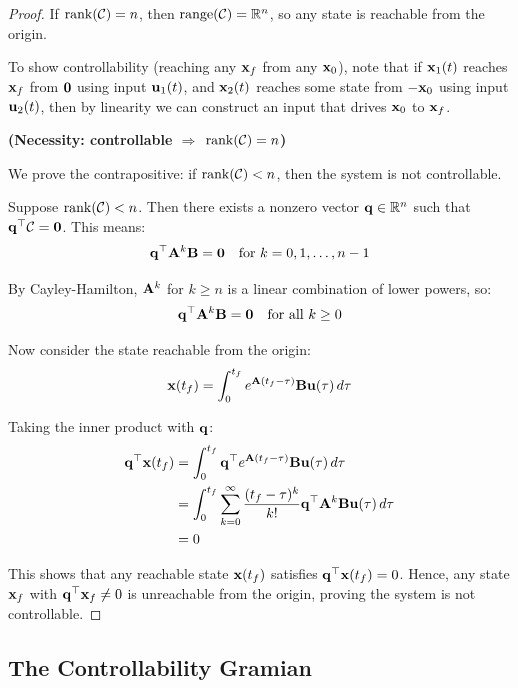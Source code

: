 \begin{proof}
If $\operatorname{rank}(\mathcal{C}) = n$, then $\text{range}(\mathcal{C}) = \mathbb{R}^n$, so any state is reachable from the origin.

To show controllability (reaching any $\mathbf{x}_f$ from any $\mathbf{x}_0$), note that if $\mathbf{x}_1(t)$ reaches $\mathbf{x}_f$ from $\mathbf{0}$ using input $\mathbf{u}_1(t)$, and $\mathbf{x}_2(t)$ reaches some state from $-\mathbf{x}_0$ using input $\mathbf{u}_2(t)$, then by linearity we can construct an input that drives $\mathbf{x}_0$ to $\mathbf{x}_f$.

\textbf{(Necessity: controllable $\Rightarrow$ $\operatorname{rank}(\mathcal{C}) = n$)}

We prove the contrapositive: if $\operatorname{rank}(\mathcal{C}) < n$, then the system is not controllable.

Suppose $\operatorname{rank}(\mathcal{C}) < n$. Then there exists a nonzero vector $\mathbf{q} \in \mathbb{R}^n$ such that $\mathbf{q}^\top \mathcal{C} = \mathbf{0}$. This means:
\begin{equation}
\mathbf{q}^\top \mathbf{A}^k\mathbf{B} = \mathbf{0} \quad \text{for } k = 0, 1, \ldots, n-1
\label{eq:q_orthogonal}
\end{equation}

By Cayley-Hamilton, $\mathbf{A}^k$ for $k \geq n$ is a linear combination of lower powers, so:
\begin{equation}
\mathbf{q}^\top \mathbf{A}^k\mathbf{B} = \mathbf{0} \quad \text{for all } k \geq 0
\end{equation}

Now consider the state reachable from the origin:
\begin{equation}
\mathbf{x}(t_f) = \int_0^{t_f} e^{\mathbf{A}(t_f-\tau)}\mathbf{B}\mathbf{u}(\tau)\,d\tau
\end{equation}

Taking the inner product with $\mathbf{q}$:
\begin{align}
\mathbf{q}^\top\mathbf{x}(t_f) &= \int_0^{t_f} \mathbf{q}^\top e^{\mathbf{A}(t_f-\tau)}\mathbf{B}\mathbf{u}(\tau)\,d\tau \\
&= \int_0^{t_f} \sum_{k=0}^{\infty} \frac{(t_f-\tau)^k}{k!}\mathbf{q}^\top\mathbf{A}^k\mathbf{B}\mathbf{u}(\tau)\,d\tau \\
&= 0
\end{align}

This shows that any reachable state $\mathbf{x}(t_f)$ satisfies $\mathbf{q}^\top\mathbf{x}(t_f) = 0$. Hence, any state $\mathbf{x}_f$ with $\mathbf{q}^\top\mathbf{x}_f \neq 0$ is unreachable from the origin, proving the system is not controllable.
\end{proof}

\subsection{The Controllability Gramian}

